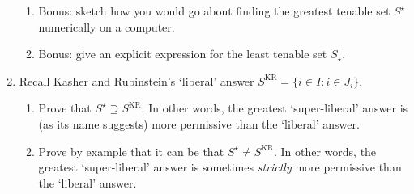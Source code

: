 \begin{exercise}
\begin{enumerate}[label=(\alph*),resume]
\begin{enumerate}[label=(\roman*)]
			\item \label{item:algo} Bonus: sketch how you would go about finding the greatest tenable set $S^\star$ numerically on a computer.
		
			\item \label{item:varnothing} Bonus: give an explicit expression for the least tenable set $S_\star$.
		
		\end{enumerate}

		\item Recall Kasher and Rubinstein's `liberal' answer $S^\text{KR} = \{ i \in I : i \in J_i \}$. 

		\begin{enumerate}[label=(\roman*)]
		
			\item Prove that $S^\star \supseteq S^\text{KR}$. In other words, the greatest `super-liberal' answer is (as its name suggests) more permissive than the `liberal' answer.

			\item Prove by example that it can be that $S^\star \neq S^\text{KR}$. In other words, the greatest `super-liberal' answer is sometimes \emph{strictly} more permissive than the `liberal' answer.
		
		\end{enumerate}

	\end{enumerate}
\end{exercise}

